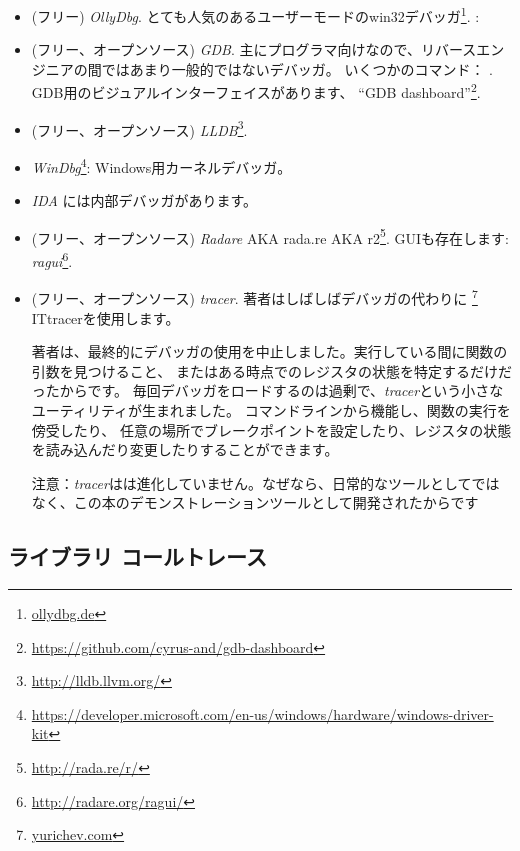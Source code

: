 \begin{itemize}
\item (フリー) \emph{OllyDbg}.
とても人気のあるユーザーモードのwin32デバッガ\footnote{\href{http://go.yurichev.com/17032}{ollydbg.de}}.
\ShortHotKeyCheatsheet: 

\item (フリー、オープンソース) \emph{GDB}.
主にプログラマ向けなので、リバースエンジニアの間ではあまり一般的ではないデバッガ。
いくつかのコマンド： .
GDB用のビジュアルインターフェイスがあります、 ``GDB dashboard''\footnote{\url{https://github.com/cyrus-and/gdb-dashboard}}.

\item (フリー、オープンソース) \emph{LLDB}\footnote{\url{http://lldb.llvm.org/}}.

\item \emph{WinDbg}\footnote{\url{https://developer.microsoft.com/en-us/windows/hardware/windows-driver-kit}}:
Windows用カーネルデバッガ。

\item \emph{IDA} には内部デバッガがあります。

\item (フリー、オープンソース) \emph{Radare} \ac{AKA} rada.re \ac{AKA} r2\footnote{\url{http://rada.re/r/}}.
GUIも存在します: \emph{ragui}\footnote{\url{http://radare.org/ragui/}}.

\item (フリー、オープンソース) \emph{tracer}.
\label{tracer}
著者はしばしばデバッガの代わりに
\footnote{\href{http://go.yurichev.com/17338}{yurichev.com}}
IT{tracer}を使用します。

著者は、最終的にデバッガの使用を中止しました。実行している間に関数の引数を見つけること、
またはある時点でのレジスタの状態を特定するだけだったからです。
毎回デバッガをロードするのは過剰で、\emph{tracer}という小さなユーティリティが生まれました。
コマンドラインから機能し、関数の実行を傍受したり、
任意の場所でブレークポイントを設定したり、レジスタの状態を読み込んだり変更したりすることができます。

注意：\emph{tracer}はは進化していません。なぜなら、日常的なツールとしてではなく、この本のデモンストレーションツールとして開発されたからです
\end{itemize}

\subsection{ライブラリ コールトレース}

